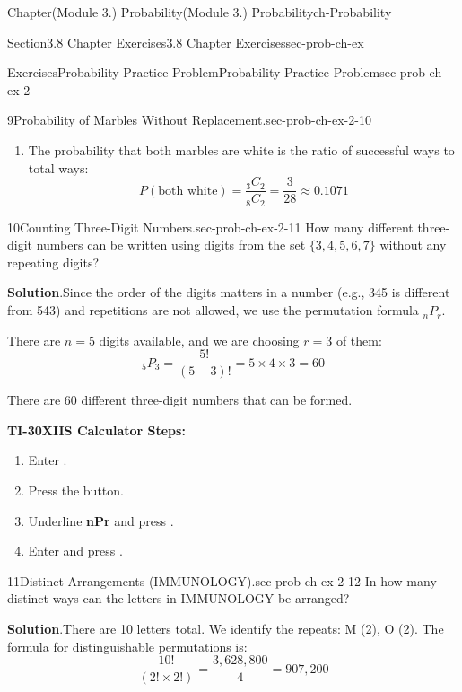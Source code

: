 \documentclass[oneside,10pt,]{book}
\newcommand{\blocktitlefont}{\relax}
\newcommand{\terminology}[1]{\textbf{#1}}
\newcommand{\kbd}[1]{\keys{{#1}}}
\begin{document}
\begin{chapterptx}{Chapter}{(Module 3.) Probability}{}{(Module 3.) Probability}{}{}{ch-Probability}
\begin{sectionptx}{Section}{3.8 Chapter Exercises}{}{3.8 Chapter Exercises}{}{}{sec-prob-ch-ex}
\begin{exercises-subsection-numberless}{Exercises}{Probability Practice Problem}{}{Probability Practice Problem}{}{}{sec-prob-ch-ex-2}
\begin{divisionexercise}{9}{Probability of Marbles Without Replacement.}{}{sec-prob-ch-ex-2-10}
\begin{enumerate}[label={\alph*}]
%
\item{}The probability that both marbles are white is the ratio of successful ways to total ways:%
\begin{equation*}
P(\text{both white}) = \frac{{}_{3}C_{2}}{{}_{8}C_{2}} = \frac{3}{28} \approx 0.1071
\end{equation*}
%
\end{enumerate}
%
\end{divisionexercise}%
\begin{divisionexercise}{10}{Counting Three-Digit Numbers.}{}{sec-prob-ch-ex-2-11}%
How many different three-digit numbers can be written using digits from the set \(\{3,4,5,6,7\}\) without any repeating digits?%
\par\smallskip%
\noindent\textbf{\blocktitlefont Solution}.\hypertarget{sec-prob-ch-ex-2-11-3}{}\quad{}Since the order of the digits matters in a number (e.g., 345 is different from 543) and repetitions are not allowed, we use the permutation formula \({}_{n}P_{r}\).%
\par
There are \(n=5\) digits available, and we are choosing \(r=3\) of them:%
\begin{equation*}
{}_{5}P_{3} = \frac{5!}{(5-3)!} = 5 \times 4 \times 3 = 60
\end{equation*}
%
\par
There are 60 different three-digit numbers that can be formed.%
\par
\terminology{TI-30XIIS Calculator Steps:}%
\begin{enumerate}[label={(\alph*)}]
\item{}Enter \kbd{5}.%
\item{}Press the \kbd{PRB} button.%
\item{}Underline \terminology{nPr} and press \kbd{ENTER}.%
\item{}Enter \kbd{3} and press \kbd{ENTER}.%
\end{enumerate}
%
\end{divisionexercise}%
\begin{divisionexercise}{11}{Distinct Arrangements (IMMUNOLOGY).}{}{sec-prob-ch-ex-2-12}%
In how many distinct ways can the letters in IMMUNOLOGY be arranged?%
\par\smallskip%
\noindent\textbf{\blocktitlefont Solution}.\hypertarget{sec-prob-ch-ex-2-12-3}{}\quad{}There are 10 letters total. We identify the repeats: M (2), O (2). The formula for distinguishable permutations is:%
\begin{equation*}
\frac{10!}{(2! \times 2!)} = \frac{3,628,800}{4} = 907,200

\end{equation*}
\end{divisionexercise}
\end{exercises-subsection-numberless}
\end{sectionptx}
\end{chapterptx}
\end{document}
